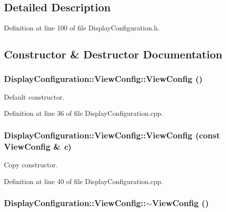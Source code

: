 \subsection{Detailed Description}


Definition at line 100 of file DisplayConfiguration.h.

\subsection{Constructor \& Destructor Documentation}
\hypertarget{class_d_d4hep_1_1_display_configuration_1_1_view_config_a9c9aa8312c88a38b22821eec6fff56d7}{
\subsubsection[{ViewConfig}]{\setlength{\rightskip}{0pt plus 5cm}DisplayConfiguration::ViewConfig::ViewConfig ()}}
\label{class_d_d4hep_1_1_display_configuration_1_1_view_config_a9c9aa8312c88a38b22821eec6fff56d7}


Default constructor. 

Definition at line 36 of file DisplayConfiguration.cpp.\hypertarget{class_d_d4hep_1_1_display_configuration_1_1_view_config_a0aa07c8fc66c04a825f00a06f8812bd3}{
\subsubsection[{ViewConfig}]{\setlength{\rightskip}{0pt plus 5cm}DisplayConfiguration::ViewConfig::ViewConfig (const {\bf ViewConfig} \& {\em c})}}
\label{class_d_d4hep_1_1_display_configuration_1_1_view_config_a0aa07c8fc66c04a825f00a06f8812bd3}


Copy constructor. 

Definition at line 40 of file DisplayConfiguration.cpp.\hypertarget{class_d_d4hep_1_1_display_configuration_1_1_view_config_ae166c3b81d063af96886587532ac2d77}{
\subsubsection[{$\sim$ViewConfig}]{\setlength{\rightskip}{0pt plus 5cm}DisplayConfiguration::ViewConfig::$\sim$ViewConfig ()}}
\label{class_d_d4hep_1_1_display_configuration_1_1_view_config_ae166c3b81d063af96886587532ac2d77}



